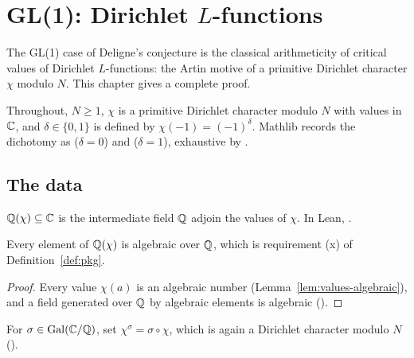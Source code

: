 \chapter{GL(1): Dirichlet $L$-functions}
\label{chap:gl1}

The GL(1) case of Deligne's conjecture is the classical arithmeticity of critical
values of Dirichlet $L$-functions: the Artin motive of a primitive Dirichlet character
$\chi$ modulo $N$. This chapter gives a complete proof.

Throughout, $N \geq 1$, $\chi$ is a primitive Dirichlet character modulo $N$ with
values in $\mathbb{C}$, and $\delta \in \{0,1\}$ is defined by $\chi(-1) = (-1)^{\delta}$.
Mathlib records the dichotomy as  ($\delta = 0$) and
 ($\delta = 1$), exhaustive by
.

\section{The data}

\begin{definition}
  \label{def:valueField}
  \leanok
  $\mathbb{Q}(\chi) \subseteq \mathbb{C}$ is the intermediate field $\mathbb{Q}$ adjoin the values of $\chi$. In Lean,
  .
\end{definition}

\begin{lemma}
  \label{lem:valueField-algebraic}
  \leanok
  Every element of $\mathbb{Q}(\chi)$ is algebraic over $\mathbb{Q}$, which is requirement (x) of
  Definition~\ref{def:pkg}.
\end{lemma}
\begin{proof}
  \leanok
  Every value $\chi(a)$ is an algebraic number (Lemma~\ref{lem:values-algebraic}), and a field
  generated over $\mathbb{Q}$ by algebraic elements is algebraic
  ().
\end{proof}

\begin{definition}
  \label{def:galoisConj}
  \leanok
  For $\sigma \in \operatorname{Gal}(\mathbb{C}/\mathbb{Q})$, set $\chi^{\sigma} = \sigma \circ \chi$,
  which is again a Dirichlet character modulo $N$ ().
\end{definition}


